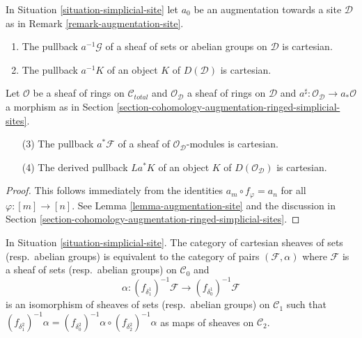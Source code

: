 \begin{lemma}
\label{lemma-augmentation-cartesian-module}
In Situation \ref{situation-simplicial-site} let
$a_0$ be an augmentation towards a site $\mathcal{D}$ as in
Remark \ref{remark-augmentation-site}.
\begin{enumerate}
\item The pullback $a^{-1}\mathcal{G}$ of a sheaf of sets or abelian groups
on $\mathcal{D}$ is cartesian.
\item The pullback $a^{-1}K$ of an object $K$ of $D(\mathcal{D})$
is cartesian.
\end{enumerate}
Let $\mathcal{O}$ be a sheaf of rings on $\mathcal{C}_{total}$ and
$\mathcal{O}_\mathcal{D}$ a sheaf of rings on $\mathcal{D}$
and $a^\sharp : \mathcal{O}_\mathcal{D} \to a_*\mathcal{O}$ a
morphism as in
Section \ref{section-cohomology-augmentation-ringed-simplicial-sites}.
\begin{enumerate}
\item[(3)] The pullback $a^*\mathcal{F}$ of a sheaf of
$\mathcal{O}_\mathcal{D}$-modules is cartesian.
\item[(4)] The derived pullback $La^*K$ of an object
$K$ of $D(\mathcal{O}_\mathcal{D})$ is cartesian.
\end{enumerate}
\end{lemma}

\begin{proof}
This follows immediately from the identities
$a_m \circ f_\varphi = a_n$ for all $\varphi : [m] \to [n]$.
See Lemma \ref{lemma-augmentation-site} and the discussion in
Section \ref{section-cohomology-augmentation-ringed-simplicial-sites}.
\end{proof}

\begin{lemma}
\label{lemma-characterize-cartesian}
In Situation \ref{situation-simplicial-site}.
The category of cartesian sheaves of sets (resp.\ abelian groups)
is equivalent to the category of pairs $(\mathcal{F}, \alpha)$
where $\mathcal{F}$ is a sheaf of sets (resp.\ abelian groups)
on $\mathcal{C}_0$ and
$$
\alpha :
(f_{\delta_1^1})^{-1}\mathcal{F}
\longrightarrow (f_{\delta_0^1})^{-1}\mathcal{F}
$$
is an isomorphism of sheaves of sets (resp.\ abelian groups)
on $\mathcal{C}_1$ such that
$(f_{\delta^2_1})^{-1}\alpha =
(f_{\delta^2_0})^{-1}\alpha \circ (f_{\delta^2_2})^{-1}\alpha$
as maps of sheaves on $\mathcal{C}_2$.
\end{lemma}

